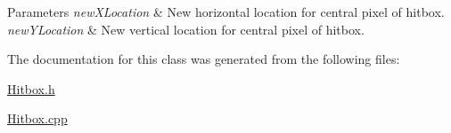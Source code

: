 \begin{DoxyParams}{Parameters}
{\em new\+X\+Location} & New horizontal location for central pixel of hitbox. \\
\hline
{\em new\+Y\+Location} & New vertical location for central pixel of hitbox. \\
\hline
\end{DoxyParams}


The documentation for this class was generated from the following files\+:\begin{DoxyCompactItemize}
\item 
\hyperlink{_hitbox_8h}{Hitbox.\+h}\item 
\hyperlink{_hitbox_8cpp}{Hitbox.\+cpp}\end{DoxyCompactItemize}
